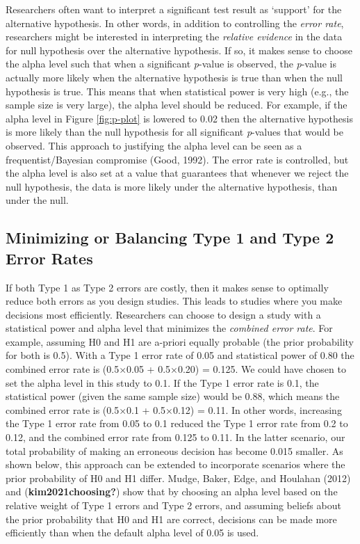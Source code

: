 \documentclass[
  english,
  ,jou, a4paper,floatsintext]{apa6}
\begin{document}
Researchers often want to interpret a significant test result as `support' for the alternative hypothesis. In other words, in addition to controlling the \emph{error rate}, researchers might be interested in interpreting the \emph{relative evidence} in the data for null hypothesis over the alternative hypothesis. If so, it makes sense to choose the alpha level such that when a significant \emph{p}-value is observed, the \emph{p}-value is actually more likely when the alternative hypothesis is true than when the null hypothesis is true. This means that when statistical power is very high (e.g., the sample size is very large), the alpha level should be reduced. For example, if the alpha level in Figure \ref{fig:p-plot} is lowered to 0.02 then the alternative hypothesis is more likely than the null hypothesis for all significant \emph{p}-values that would be observed. This approach to justifying the alpha level can be seen as a frequentist/Bayesian compromise (Good, 1992). The error rate is controlled, but the alpha level is also set at a value that guarantees that whenever we reject the null hypothesis, the data is more likely under the alternative hypothesis, than under the null.

\hypertarget{minimizing-or-balancing-type-1-and-type-2-error-rates}{%
\subsection{Minimizing or Balancing Type 1 and Type 2 Error Rates}\label{minimizing-or-balancing-type-1-and-type-2-error-rates}}

If both Type 1 as Type 2 errors are costly, then it makes sense to optimally reduce both errors as you design studies. This leads to studies where you make decisions most efficiently. Researchers can choose to design a study with a statistical power and alpha level that minimizes the \emph{combined error rate}. For example, assuming H0 and H1 are a-priori equally probable (the prior probability for both is 0.5). With a Type 1 error rate of 0.05 and statistical power of 0.80 the combined error rate is (0.5×0.05 + 0.5×0.20) = 0.125. We could have chosen to set the alpha level in this study to 0.1. If the Type 1 error rate is 0.1, the statistical power (given the same sample size) would be 0.88, which means the combined error rate is (0.5×0.1 + 0.5×0.12) = 0.11. In other words, increasing the Type 1 error rate from 0.05 to 0.1 reduced the Type 1 error rate from 0.2 to 0.12, and the combined error rate from 0.125 to 0.11. In the latter scenario, our total probability of making an erroneous decision has become 0.015 smaller. As shown below, this approach can be extended to incorporate scenarios where the prior probability of H0 and H1 differ. Mudge, Baker, Edge, and Houlahan (2012) and (\textbf{kim2021choosing?}) show that by choosing an alpha level based on the relative weight of Type 1 errors and Type 2 errors, and assuming beliefs about the prior probability that H0 and H1 are correct, decisions can be made more efficiently than when the default alpha level of 0.05 is used.
\end{document}

